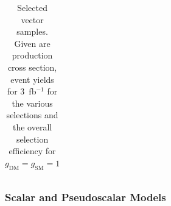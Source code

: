 \begin{table}[h!]
\begin{tabular}{lllllll}
\hline
\end{tabular}
\caption{Selected vector samples. Given are production cross section, event yields for 3~fb$^{-1 }$ for the various selections and the overall selection efficiency for $g_\textrm{DM}=g_\textrm{SM}=1$}
\label{tab:dm_V_g1_3fb}
\end{table}




\clearpage
\subsubsection{Scalar and Pseudoscalar Models} \label{sec:dm_pscalar}

